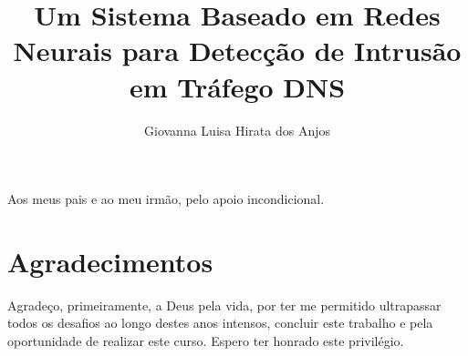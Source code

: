 \documentclass[a4paper,12pt,twoside,english,brazilian]{book}
\title{Um Sistema Baseado em Redes Neurais para Detecção de Intrusão em Tráfego DNS}
\author[fem]{Giovanna Luisa Hirata dos Anjos}
\begin{document}

\frontmatter

\pagestyle{plain}

\onehalfspacing %

\maketitle %


\begin{dedicatoria}
Aos meus pais e ao meu irmão, pelo apoio incondicional.
\end{dedicatoria}


\chapter*{Agradecimentos}

Agradeço, primeiramente, a Deus pela vida, por ter me permitido ultrapassar todos os desafios ao longo destes anos intensos, concluir este trabalho e pela oportunidade de realizar este curso. Espero ter honrado este privilégio.
\end{document}
